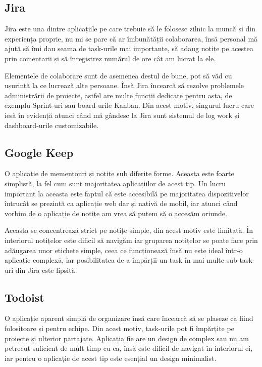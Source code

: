 \subsection{Jira}

Jira este una dintre aplicațiile pe care trebuie să le folosesc zilnic
la muncă și din experiența proprie, nu mi se pare că ar îmbunătății colaborarea,
însă personal mă ajută să îmi dau seama de task-urile mai importante, să adaug
notițe pe acestea prin comentarii și să înregistrez numărul de ore cât am lucrat la ele.

Elementele de colaborare sunt de asemenea destul de bune, pot să văd cu ușurință
la ce lucrează alte persoane. Însă Jira încearcă să rezolve problemele administrării
de proiecte, astfel are multe funcții dedicate pentru asta, de exemplu Sprint-uri sau
board-urile Kanban. Din acest motiv, singurul lucru care iesă în evidență atunci
când mă gândesc la Jira sunt sistemul de log work și dashboard-urile customizabile.

\subsection{Google Keep}

O aplicație de mementouri și notițe sub diferite forme. Aceasta este foarte simplistă,
la fel cum sunt majoritatea aplicațiilor de acest tip. Un lucru important la aceasta
este faptul că este accesibilă pe majoritatea dispozitivelor întrucât se prezintă
ca aplicație web dar și nativă de mobil, iar atunci când vorbim de o aplicație de notițe
am vrea să putem să o accesăm oriunde.

Aceasta se concentrează strict pe notițe simple, din acest motiv este limitată. În interiorul
notițelor este dificil să navigăm iar gruparea notițelor se poate face prin adăugarea
unor etichete simple, ceea ce funcționează însă nu este ideal într-o aplicație complexă,
iar posibilitatea de a împărții un task în mai multe sub-task-uri din Jira este lipsită.

\subsection{Todoist}

O aplicație aparent simplă de organizare însă care încearcă să se plaseze ca fiind folositoare
și pentru echipe. Din acest motiv, task-urile pot fi împărțite pe proiecte și ulterior partajate.
Aplicația fie are un design de complex sau nu am petrecut suficient de mult timp cu ea,
însă este dificil de navigat în interiorul ei, iar pentru o aplicație de acest tip este
esențial un design minimalist.

